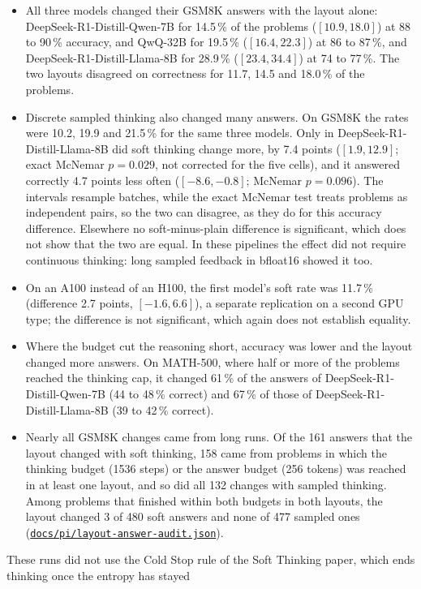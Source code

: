 \documentclass[11pt,letterpaper]{article}
\newcommand{\repourl}{https://github.com/tdj28/neural-shrimp}
\newcommand{\reporef}{arxiv-v1}
\newcommand{\repo}[1]{\href{\repourl/blob/\reporef/#1}{\nolinkurl{#1}}}
\begin{document}
\begin{itemize}
  \item All three models changed their GSM8K answers with the layout alone: DeepSeek-R1-Distill-Qwen-7B
  for 14.5\,\% of the problems ($[10.9,18.0]$) at 88 to 90\,\% accuracy, and QwQ-32B for 19.5\,\% ($[16.4,22.3]$) at
  86 to 87\,\%, and DeepSeek-R1-Distill-Llama-8B for 28.9\,\% ($[23.4,34.4]$) at 74 to 77\,\%. The two layouts disagreed
  on correctness for 11.7, 14.5 and 18.0\,\% of the problems.
  \item Discrete sampled thinking also changed many answers. On GSM8K the rates were 10.2, 19.9 and 21.5\,\% for the
  same three models. Only in DeepSeek-R1-Distill-Llama-8B did soft thinking change more, by 7.4 points
  ($[1.9,12.9]$; exact McNemar $p=0.029$, not corrected for the five cells), and it answered correctly 4.7 points less
  often ($[-8.6,-0.8]$; McNemar $p=0.096$). The intervals resample batches, while the exact McNemar test treats
  problems as independent pairs, so the two can disagree, as they do for this accuracy difference. Elsewhere no soft-minus-plain
  difference is significant, which does not show that the two are equal. In these pipelines the effect did not
  require continuous thinking: long sampled feedback in bfloat16 showed it too.
  \item On an A100 instead of an H100, the first model's soft rate was 11.7\,\% (difference 2.7 points,
  $[-1.6,6.6]$), a separate replication on a second GPU type; the difference is not significant, which again does not
  establish equality.
  \item Where the budget cut the reasoning short, accuracy was lower and the layout changed more answers. On MATH-500,
  where half or more of the problems reached the thinking cap, it changed 61\,\% of the answers of
  DeepSeek-R1-Distill-Qwen-7B (44 to 48\,\% correct) and 67\,\% of those of DeepSeek-R1-Distill-Llama-8B (39 to
  42\,\% correct).
  \item Nearly all GSM8K changes came from long runs. Of the 161 answers that the layout changed with soft thinking,
  158 came from problems in which the thinking budget (1536 steps) or the answer budget (256 tokens) was reached in at
  least one layout, and so did all 132 changes with sampled thinking. Among problems that finished within both budgets
  in both layouts, the layout changed 3 of 480 soft answers and none of 477 sampled ones
  (\repo{docs/pi/layout-answer-audit.json}).
\end{itemize}
These runs did not use the Cold Stop rule of the Soft Thinking paper, which ends thinking once the entropy has stayed
\end{document}
